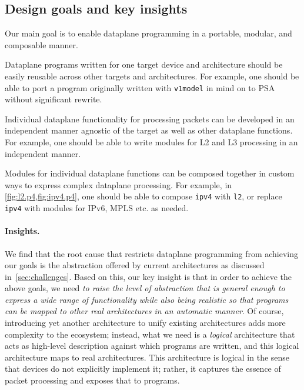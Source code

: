 \documentclass[letterpaper,twocolumn,10pt]{article}
\begin{document}
\subsection{Design goals and key insights}
\label{sec:goals}
\label{sec:insights}

Our main goal is to enable dataplane programming in a portable,
modular, and composable manner.

 Dataplane programs written for one target device
and architecture should be easily reusable across other targets and
architectures. For example, one should be able to port a program
originally written with \texttt{v1model} in mind on to PSA without
significant rewrite.

 Individual dataplane functionality for processing
packets can be developed in an independent manner agnostic of the
target as well as other dataplane functions. For example, one should
be able to write modules for L2 and L3 processing in an independent
manner.

 Modules for individual dataplane functions can
be composed together in custom ways to express complex dataplane
processing. For example, in \cref{fig:l2.p4,fig:ipv4.p4}, one should
be able to compose \texttt{ipv4} with \texttt{l2}, or replace
\texttt{ipv4} with modules for IPv6, MPLS etc. as needed.





\paragraph{Insights.}
We find that the root cause that restricts dataplane programming from
achieving our goals is the abstraction offered by current
architectures as discussed in~\cref{sec:challenges}. Based on this,
our key insight is that in order to achieve the above goals, we need
\emph{to raise the level of abstraction that is general enough to
  express a wide range of functionality while also being realistic so
  that programs can be mapped to other real architectures in an
automatic manner}. Of course, introducing yet another architecture to
unify existing architectures adds more complexity to the ecosystem;
instead, what we need is a \emph{logical} architecture that acts as
high-level description against which programs are written, and this
logical architecture maps to real architectures. This architecture is
logical in the sense that devices do not explicitly implement it;
rather, it captures the essence of packet processing and exposes that
to programs.
\end{document}
